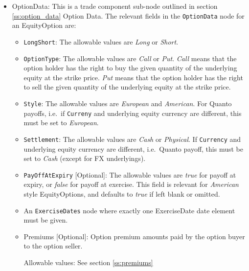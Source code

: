 \begin{itemize}
	\item OptionData: This is a trade component sub-node outlined in section \ref{ss:option_data} Option Data. The relevant fields in the \lstinline!OptionData! node for an EquityOption are:

	
	\begin{itemize}
	\item \lstinline!LongShort!: The allowable values are \emph{Long} or \emph{Short}.

	\item \lstinline!OptionType!: The allowable values are \emph{Call} or \emph{Put}.  \emph{Call} means that the option holder has the right to buy the given quantity of the underlying equity at the strike price.  \emph{Put} means that the option holder has the right to sell the given quantity of the underlying equity at the strike price. 
	
\item  \lstinline!Style!: The allowable values are \emph{European} and \emph{American}. For Quanto payoffs, i.e.\ if \lstinline!Curreny! and underlying equity currency are different, this must be set to \emph{European}.

\item  \lstinline!Settlement!: The allowable values are \emph{Cash} or \emph{Physical}. If
\lstinline!Currency! and underlying equity currency are different, i.e.\ Quanto payoff, this
must be set to \emph{Cash} (except for FX underlyings).

\item \lstinline!PayOffAtExpiry! [Optional]: The allowable values are \emph{true} for payoff at expiry, or \emph{false} for payoff at exercise. This field is relevant for \emph{American} style EquityOptions, and defaults to \emph{true} if left blank or omitted. 

\item An \lstinline!ExerciseDates! node where exactly one ExerciseDate date element must be given. 

\item Premiums [Optional]: Option premium amounts paid by the option buyer to the option seller.

Allowable values:  See section \ref{ss:premiums}

\end{itemize}
	


\end{itemize}
